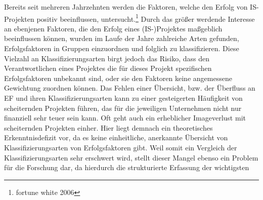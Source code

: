 Bereits seit mehreren Jahrzehnten werden die Faktoren, welche den Erfolg von IS-\-Pro\-jek\-ten positiv beeinflussen, untersucht.\footnote{fortune white 2006}
Durch das größer werdende Interesse an ebenjenen Faktoren, die den Erfolg eines (IS-)Projektes maßgeblich 
beeinflussen können, wurden im Laufe der Jahre zahlreiche Arten gefunden, Erfolgsfaktoren in Gruppen einzuordnen und folglich 
zu klassifizieren. %
Diese Vielzahl an Klassifizierungsarten birgt jedoch das Risiko, dass den Verantwortlichen 
eines Projektes die für dieses Projekt spezifischen Erfolgsfaktoren unbekannt sind, 
oder sie den Faktoren keine angemessene Gewichtung zuordnen 
können. Das Fehlen einer Übersicht, bzw. der Überfluss an EF und ihren Klassifizierungsarten kann zu einer gesteigerten 
Häufigkeit von scheiternden Projekten führen, das für die jeweiligen Unternehmen nicht nur finanziell sehr teuer sein kann.
Oft geht auch ein erheblicher Imageverlust mit scheiternden Projekten einher. 
Hier liegt demnach ein theoretisches Erkenntnisdefizit vor, da es keine einheitliche, anerkannte Übersicht von 
Klassifizierungsarten von Erfolgsfaktoren gibt. Weil somit ein Vergleich der Klassifizierungsarten sehr erschwert wird, stellt dieser
Mangel ebenso ein Problem für die Forschung dar, da hierdurch die strukturierte Erfassung der wichtigsten 

